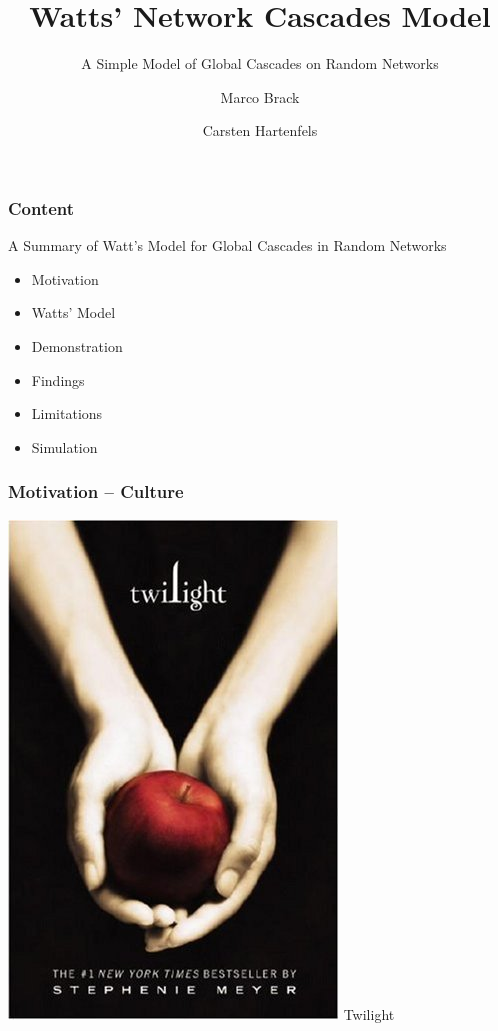 \documentclass[slidestop,usenames,dvipsnames]{beamer}
\title{Watts' Network Cascades Model}
\subtitle{A Simple Model of Global Cascades on Random Networks}
\author{Marco Brack \and Carsten Hartenfels}
\newcommand{\gitem}{\vfill\item}
\begin{document}
\begin{frame}
    \titlepage
\end{frame}




\begin{frame}
    \frametitle{Content}
    A Summary of Watt's Model for Global Cascades in Random Networks
    \begin{itemize}
        \gitem Motivation
        \gitem Watts' Model
        \gitem Demonstration
        \gitem Findings
        \gitem Limitations
        \gitem Simulation
    \end{itemize}
    \vfill
\end{frame}


\begin{frame}
    \frametitle{Motivation -- Culture}
    \begin{center}
        \includegraphics[height=0.7\textheight]{img/twilight}
        \vfill\vspace{8pt}
        {\huge Twilight}
    \end{center}
    \vfill
\end{frame}
\end{document}
